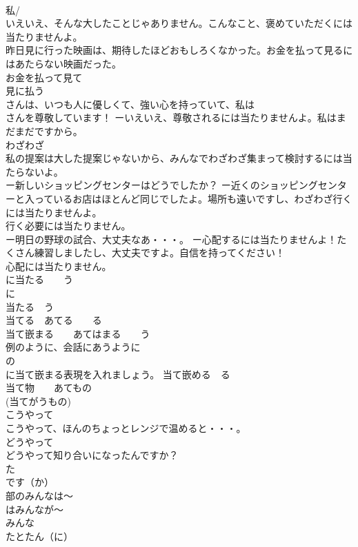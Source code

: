 \documentclass[8pt]{extreport}
\begin{document}
\begin{CJK}{UTF8}{min}
\\	私/
\\	いえいえ、そんな大したことじゃありません。こんなこと、褒めていただくには当たりませんよ。 
\\	昨日見に行った映画は、期待したほどおもしろくなかった。お金を払って見るにはあたらない映画だった。 
\\	お金を払って見て
\\	見に払う 
\\	さんは、いつも人に優しくて、強い心を持っていて、私は
\\	さんを尊敬しています！ ーいえいえ、尊敬されるには当たりませんよ。私はまだまだですから。 
\\	わざわざ 
\\	私の提案は大した提案じゃないから、みんなでわざわざ集まって検討するには当たらないよ。 
\\	ー新しいショッピングセンターはどうでしたか？ ー近くのショッピングセンターと入っているお店はほとんど同じでしたよ。場所も遠いですし、わざわざ行くには当たりませんよ。 
\\	行く必要には当たりません。 
\\	ー明日の野球の試合、大丈夫なあ・・・。 ー心配するには当たりませんよ！たくさん練習しましたし、大丈夫ですよ。自信を持ってください！ 
\\	心配には当たりません。
\\	に当たる　　う
\\	に 
\\	当たる　う
\\	当てる　あてる　　る
\\	当て嵌まる　　あてはまる　　う
\\	例のように、会話にあうように
\\	の
\\	に当て嵌まる表現を入れましょう。 当て嵌める　る
\\	当て物　　あてもの 
\\	(当てがうもの) 
\\	こうやって	
\\	こうやって、ほんのちょっとレンジで温めると・・・。 
\\	どうやって　 
\\	どうやって知り合いになったんですか？ 
\\	た
\\	です（か）
\\	部のみんなは～ 
\\	はみんなが～ 
\\	みんな 
\\	たとたん（に）	

\end{CJK}
\end{document}
